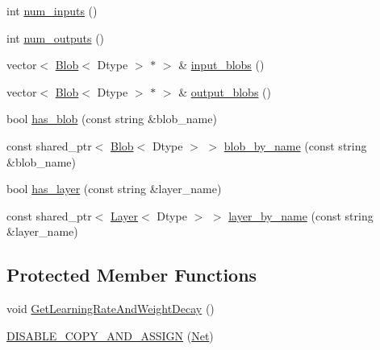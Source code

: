 \begin{DoxyCompactItemize}
\item 
int \hyperlink{classcaffe_1_1_net_a5e9d22ba3d645b3fcd806e6d4ac84407}{num\+\_\+inputs} ()
\item 
int \hyperlink{classcaffe_1_1_net_ac584f6ccbefdc6d9e5a498e06dcfb9d6}{num\+\_\+outputs} ()
\item 
vector$<$ \hyperlink{classcaffe_1_1_blob}{Blob}$<$ Dtype $>$ $\ast$ $>$ \& \hyperlink{classcaffe_1_1_net_a1ef3770e0fec193f6ee14ca1a7eb7c9a}{input\+\_\+blobs} ()
\item 
vector$<$ \hyperlink{classcaffe_1_1_blob}{Blob}$<$ Dtype $>$ $\ast$ $>$ \& \hyperlink{classcaffe_1_1_net_ac9d72d39f7d4b8d68c6d400f60eefb39}{output\+\_\+blobs} ()
\item 
bool \hyperlink{classcaffe_1_1_net_a860b9340527c9b41c9744ec71c705682}{has\+\_\+blob} (const string \&blob\+\_\+name)
\item 
const shared\+\_\+ptr$<$ \hyperlink{classcaffe_1_1_blob}{Blob}$<$ Dtype $>$ $>$ \hyperlink{classcaffe_1_1_net_a032a2be8752ae4d4123677afbcebc744}{blob\+\_\+by\+\_\+name} (const string \&blob\+\_\+name)
\item 
bool \hyperlink{classcaffe_1_1_net_a93f62dd95e25cbbac68dc686d9366dc8}{has\+\_\+layer} (const string \&layer\+\_\+name)
\item 
const shared\+\_\+ptr$<$ \hyperlink{classcaffe_1_1_layer}{Layer}$<$ Dtype $>$ $>$ \hyperlink{classcaffe_1_1_net_aafb72f05150abc94af5317d1b33b197b}{layer\+\_\+by\+\_\+name} (const string \&layer\+\_\+name)
\end{DoxyCompactItemize}
\subsection*{Protected Member Functions}
\begin{DoxyCompactItemize}
\item 
void \hyperlink{classcaffe_1_1_net_a9b298f9b34469e0ec2bd1b58df84b128}{Get\+Learning\+Rate\+And\+Weight\+Decay} ()
\item 
\hyperlink{classcaffe_1_1_net_a3d52b2d075fa543e687cf61ba035a488}{D\+I\+S\+A\+B\+L\+E\+\_\+\+C\+O\+P\+Y\+\_\+\+A\+N\+D\+\_\+\+A\+S\+S\+I\+G\+N} (\hyperlink{classcaffe_1_1_net}{Net})
\end{DoxyCompactItemize}
